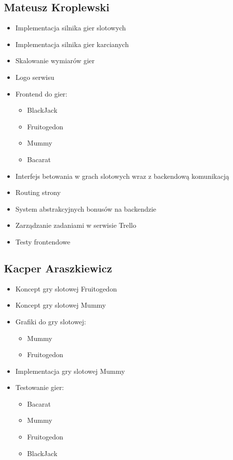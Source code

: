 \documentclass[a4paper,12pt]{article}
\begin{document}
\subsection{Mateusz Kroplewski}
\begin{itemize}
    \item Implementacja silnika gier slotowych
    \item Implementacja silnika gier karcianych
    \item Skalowanie wymiarów gier
    \item Logo serwisu
    \item Frontend do gier:
    \begin{itemize}
        \item BlackJack
        \item Fruitogedon
        \item Mummy
        \item Bacarat
    \end{itemize}
    \item Interfejs betowania w grach slotowych wraz z backendową komunikacją
    \item Routing strony
    \item System abstrakcyjnych bonusów na backendzie
    \item Zarządzanie zadaniami w serwisie Trello
    \item Testy frontendowe
\end{itemize}

\subsection{Kacper Araszkiewicz}
\begin{itemize}
    \item Koncept gry slotowej Fruitogedon
    \item Koncept gry slotowej Mummy
    \item Grafiki do gry slotowej:
    \begin{itemize}
        \item Mummy
        \item Fruitogedon
    \end{itemize}
    \item Implementacja gry slotowej Mummy
    \item Testowanie gier:
    \begin{itemize}
        \item Bacarat
        \item Mummy
        \item Fruitogedon
        \item BlackJack
    \end{itemize}
\end{itemize}
\end{document}
